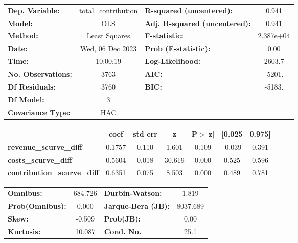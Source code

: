\begin{center}
\begin{tabular}{lclc}
\toprule
\textbf{Dep. Variable:}             & total\_contribution & \textbf{  R-squared (uncentered):}      &     0.941   \\
\textbf{Model:}                     &         OLS         & \textbf{  Adj. R-squared (uncentered):} &     0.941   \\
\textbf{Method:}                    &    Least Squares    & \textbf{  F-statistic:       }          & 2.387e+04   \\
\textbf{Date:}                      &   Wed, 06 Dec 2023  & \textbf{  Prob (F-statistic):}          &     0.00    \\
\textbf{Time:}                      &       10:00:19      & \textbf{  Log-Likelihood:    }          &    2603.7   \\
\textbf{No. Observations:}          &          3763       & \textbf{  AIC:               }          &    -5201.   \\
\textbf{Df Residuals:}              &          3760       & \textbf{  BIC:               }          &    -5183.   \\
\textbf{Df Model:}                  &             3       & \textbf{                     }          &             \\
\textbf{Covariance Type:}           &         HAC         & \textbf{                     }          &             \\
\bottomrule
\end{tabular}
\begin{tabular}{lcccccc}
                                    & \textbf{coef} & \textbf{std err} & \textbf{z} & \textbf{P$> |$z$|$} & \textbf{[0.025} & \textbf{0.975]}  \\
\midrule
\textbf{revenue\_scurve\_diff}      &       0.1757  &        0.110     &     1.601  &         0.109        &       -0.039    &        0.391     \\
\textbf{costs\_scurve\_diff}        &       0.5604  &        0.018     &    30.619  &         0.000        &        0.525    &        0.596     \\
\textbf{contribution\_scurve\_diff} &       0.6351  &        0.075     &     8.503  &         0.000        &        0.489    &        0.781     \\
\bottomrule
\end{tabular}
\begin{tabular}{lclc}
\textbf{Omnibus:}       & 684.726 & \textbf{  Durbin-Watson:     } &    1.819  \\
\textbf{Prob(Omnibus):} &   0.000 & \textbf{  Jarque-Bera (JB):  } & 8037.689  \\
\textbf{Skew:}          &  -0.509 & \textbf{  Prob(JB):          } &     0.00  \\
\textbf{Kurtosis:}      &  10.087 & \textbf{  Cond. No.          } &     25.1  \\
\bottomrule
\end{tabular}
\end{center}
